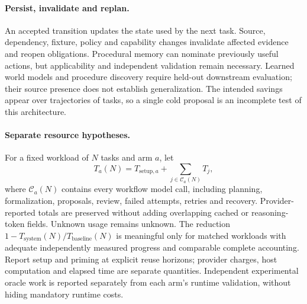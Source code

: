 \paragraph{Persist, invalidate and replan.}
An accepted transition updates the state used by the next task. Source,
dependency, fixture, policy and capability changes invalidate affected evidence
and reopen obligations. Procedural memory can nominate previously useful
actions, but applicability and independent validation remain necessary. Learned
world models and procedure discovery require held-out downstream evaluation;
their source presence does not establish generalization. The intended savings
appear over trajectories of tasks, so a single cold proposal is an incomplete
test of this architecture.

\paragraph{Separate resource hypotheses.}
For a fixed workload of $N$ tasks and arm $a$, let
\[
 T_a(N)=T_{\mathrm{setup},a}+\sum_{j\in\mathcal C_a(N)}T_j,
\]
where $\mathcal C_a(N)$ contains every workflow model call, including planning,
formalization, proposals, review, failed attempts, retries and recovery.
Provider-reported totals are preserved without adding overlapping cached or
reasoning-token fields. Unknown usage remains unknown. The reduction
$1-T_{\mathrm{system}}(N)/T_{\mathrm{baseline}}(N)$ is meaningful only for
matched workloads with adequate independently measured progress and comparable
complete accounting. Report setup and priming at explicit reuse horizons;
provider charges, host computation and elapsed time are separate quantities.
Independent experimental oracle work is reported separately from each arm's
runtime validation, without hiding mandatory runtime costs.
